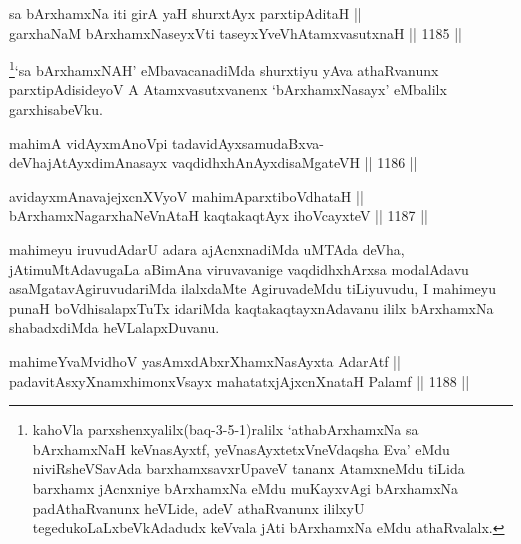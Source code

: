 
\begin{shl}
sa bArxhamxNa iti girA yaH shurxtAyx parxtipAditaH || \\
garxhaNaM bArxhamxNaseyxVti taseyxYveVhA\s \s tamxvasutxnaH \hfill || 1185 ||  
\end{shl}

\begin{artha}
\footnote{kahoVla parxshenxyalilx(baq-3-5-1)ralilx `athabArxhamxNa sa bArxhamxNaH keVnasAyxtf, yeVnasAyxtetxVneVdaqsha Eva' eMdu niviRsheVSavAda barxhamxsavxrUpaveV tananx AtamxneMdu tiLida barxhamx jAcnxniye bArxhamxNa eMdu muKayxvAgi bArxhamxNa padAthaRvanunx heVLide, adeV athaRvanunx ililxyU tegedukoLaLxbeVkAdadudx keVvala jAti bArxhamxNa eMdu athaRvalalx.}`sa bArxhamxNAH' eMbavacanadiMda shurxtiyu yAva athaRvanunx parxtipAdisideyoV A Atamxvasutxvanenx `bArxhamxNasayx' eMbalilx garxhisabeVku.
\end{artha}



\begin{shl}
mahimA vidAyxmAnoV\s pi tadavidAyxsamudaBxva- \\
deVhajAtAyxdimAnasayx vaqdidhxhAnAyxdisaMgateVH \hfill || 1186 ||  
\end{shl}
				
\begin{shl}
avidayxmAnavajejxcnXVyoV mahimAparxtiboVdhataH || \\
bArxhamxNagarxhaNeVnAtaH kaqtakaqtAyx ihoVcayxteV \hfill || 1187 ||  
\end{shl}

\begin{artha}
mahimeyu iruvudAdarU adara ajAcnxnadiMda uMTAda deVha, jAtimuMtAdavugaLa aBimAna viruvavanige vaqdidhxhArxsa modalAdavu asaMgatavAgiruvudariMda ilalxdaMte AgiruvadeMdu tiLiyuvudu, I mahimeyu punaH boVdhisalapxTuTx idariMda kaqtakaqtayxnAdavanu ililx bArxhamxNa shabadxdiMda heVLalapxDuvanu.
\end{artha}


\begin{shl}
mahimeYvaMvidhoV yasAmxdAbxrXhamxNasAyxta AdarAtf || \\
padavitAsxyXnamxhimonxV\s sayx mahatatxjAjxcnXnataH Palamf \hfill || 1188 ||  
\end{shl}

